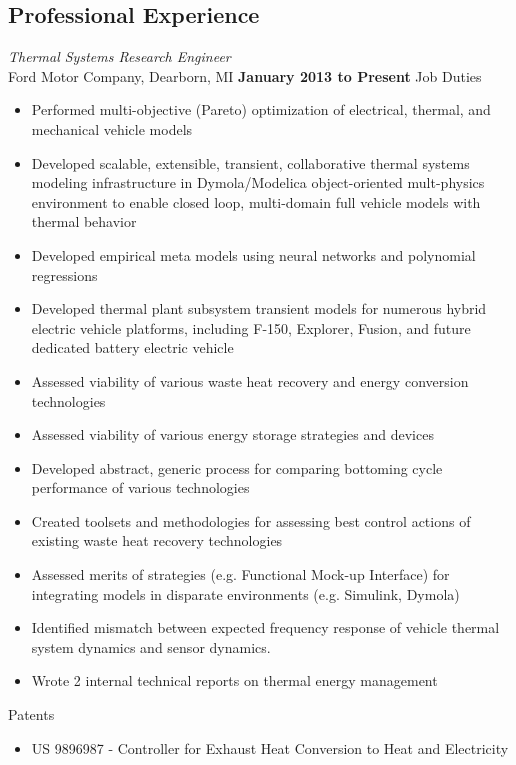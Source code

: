 \documentclass[centered]{res}
\begin{document}
\begin{resume}
\section{Professional Experience}
\textit{Thermal Systems Research Engineer} \\
Ford Motor Company, Dearborn, MI
\hfill \textbf{January 2013 to Present} 
\newline Job Duties
\begin{itemize} \itemsep -2pt %
\item Performed multi-objective (Pareto) optimization of electrical,
  thermal, and mechanical vehicle models
\item Developed scalable, extensible, transient, collaborative thermal
  systems modeling infrastructure in Dymola/Modelica object-oriented
  mult-physics environment to enable closed loop, multi-domain full
  vehicle models with thermal behavior
\item Developed empirical meta models using neural networks and
  polynomial regressions
\item Developed thermal plant subsystem transient models for numerous
  hybrid electric vehicle platforms, including F-150, Explorer,
  Fusion, and future dedicated battery electric vehicle
\item Assessed viability of various waste heat recovery and energy
  conversion technologies
\item Assessed viability of various energy storage strategies and devices
\item Developed abstract, generic process for comparing bottoming
  cycle performance of various technologies
\item Created toolsets and methodologies for assessing best control
  actions of existing waste heat recovery technologies
\item Assessed merits of strategies (e.g. Functional Mock-up
  Interface) for integrating models in disparate environments
  (e.g. Simulink, Dymola)
\item Identified mismatch between expected frequency response of
  vehicle thermal system dynamics and sensor dynamics.
\item Wrote 2 internal technical reports on thermal energy management
\end{itemize} \vspace{-8pt} 
\newpage
Patents
\begin{itemize} \itemsep -2pt %
\item US 9896987 - Controller for Exhaust Heat Conversion to Heat and Electricity

\end{itemize}
\end{resume}
\end{document}
